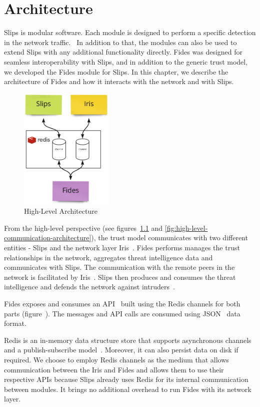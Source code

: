 \chapter{Architecture}
\label{ch:architecture}
Slips is modular software. Each module is designed to perform a specific detection in the network traffic.~\cite{slips}
In addition to that, the modules can also be used to extend Slips with any additional functionality directly. 
Fides was designed for seamless interoperability with Slips, and in addition to the generic trust model, we developed the Fides module for Slips.
In this chapter, we describe the architecture of Fides and how it interacts with the network and with Slips.

\begin{figure}[ht]
    \centering
    \includegraphics[width=0.4\textwidth]{assets/redis_channels.jpeg}
    \caption{High-Level Architecture}
    \label{fig:high-level-architecture}
\end{figure}

From the high-level perspective (see figures~\ref{fig:high-level-architecture} and \ref{fig:high-level-communication-architecture}), the trust model communicates with two different entities - Slips and the network layer Iris~\cite{nl}.
Fides performs manages the trust relationships in the network, aggregates threat intelligence data and communicates with Slips. The communication with the remote peers in the network is facilitated by Iris~\cite{nl}. 
Slips then produces and consumes the threat intelligence and defends the network against intruders~\cite{slips}.

Fides exposes and consumes an API~\cite{api} built using the Redis channels for both parts (figure~\cite{fig:high-level-communication-architecture}).
The messages and API calls are consumed using JSON~\cite{json} data format.

Redis is an in-memory data structure store that supports asynchronous channels and a publish-subscribe model~\cite{redis}. Moreover, it can also persist data on disk if required.
We choose to employ Redis channels as the medium that allows communication between the Iris and Fides and allows them to use their respective APIs because Slips already uses Redis for its internal communication between modules. It brings no additional overhead to run Fides with its network layer.

